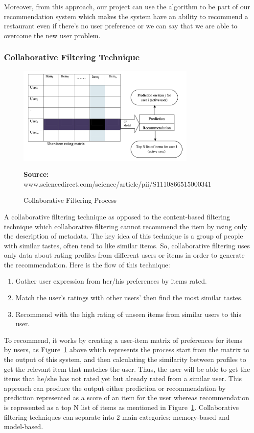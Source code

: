 \documentclass[12pt,oneside,openright,a4paper]{cpe-english-project}
\newcommand*{\captionsource}[2]{%
  \caption[{#1}]{#1}\vspace{-8pt}
  \textbf{Source:} #2}
\begin{document}
Moreover, from this approach, our project can use the algorithm to be part of our recommendation system which makes the system have an ability to recommend a restaurant even if there’s no user preference or we can say that we are able to overcome the new user problem.


\subsubsection{Collaborative Filtering Technique}

\begin{figure}[H]\centering
\includegraphics[width=250pt]{./images/2cfprocess.png}
\captionsource{Collaborative Filtering Process}{www.sciencedirect.com/science/article/pii/S1110866515000341}
\label{fig:2cfprocess}
\end{figure}\vspace{-24pt}
\vspace{1em}

A collaborative filtering technique as opposed to the content-based filtering technique which collaborative filtering cannot recommend the item by using only the description of metadata. The key idea of this technique is a group of people with similar tastes, often tend to like similar items. So, collaborative filtering uses only data about rating profiles from different users or items in order to generate the recommendation. Here is the flow of this technique:

\begin{enumerate}
\item Gather user expression from her/his preferences by items rated.
\item Match the user’s ratings with other users’ then find the most similar tastes.
\item Recommend with the high rating of unseen items from similar users to this user.
\end{enumerate}

To recommend, it works by creating a user-item matrix of preferences for items by users, as Figure~\ref{fig:2cfprocess} above which represents the process start from the matrix to the output of this system, and then calculating the similarity between profiles to get the relevant item that matches the user. Thus, the user will be able to get the items that he/she has not rated yet but already rated from a similar user. This approach can produce the output either prediction or recommendation by prediction represented as a score of an item for the user whereas recommendation is represented as a top N list of items as mentioned in Figure~\ref{fig:2cfprocess}. Collaborative filtering techniques can separate into 2 main categories: memory-based and model-based.
\end{document}
